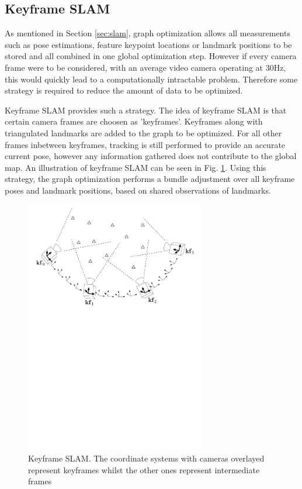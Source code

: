 \subsection{Keyframe SLAM}

As mentioned in Section \ref{sec:slam}, graph optimization allows all measurements such as pose estimations, feature keypoint locations or landmark positions to be stored and all combined in one global optimization step.  However if every camera frame were to be considered, with an average video camera operating at 30Hz, this would quickly lead to a computationally intractable problem.  Therefore some strategy is required to reduce the amount of data to be optimized.

Keyframe SLAM provides such a strategy.  The idea of keyframe SLAM is that certain camera frames are choosen as 'keyframes'.  Keyframes along with triangulated landmarks are added to the graph to be optimized.  For all other frames inbetween keyframes, tracking is still performed to provide an accurate current pose, however any information gathered does not contribute to the global map.  An illustration of keyframe SLAM can be seen in Fig. \ref{fig:keyframe_slam}.  Using this strategy, the graph optimization performs a bundle adjustment over all keyframe poses and landmark positions, based on shared observations of landmarks. 

\begin{figure}[h]
  \centering
    \includegraphics[width=0.7\textwidth]{chapters/images/keyframes}
  \caption{Keyframe SLAM.  The coordinate systems with cameras overlayed represent keyframes whilst the other ones represent intermediate frames}
  \label{fig:keyframe_slam}
\end{figure}

